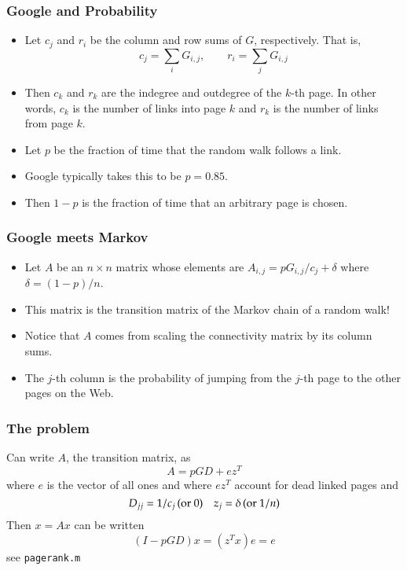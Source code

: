 \documentclass[10pt]{beamer}
\begin{document}
\begin{frame}
\frametitle{Google and Probability}
\begin{itemize}
\item Let $c_j$ and $r_i$ be the column and row sums of $G$,
respectively. That is,
$$c_j = \sum_i G_{i,j}, \qquad r_i = \sum_j G_{i,j}$$
\item Then $c_k$ and $r_k$ are the indegree and outdegree of the
$k$-th page.  In other words, $c_k$ is the number of links into page $k$ 
and $r_k$ is the number of links from page $k$.
\item Let $p$ be the fraction of time that the random walk follows
a link.
\item Google typically takes this to be $p = 0.85$.
\item Then $1-p$ is the fraction of time that an arbitrary page is
chosen.
\end{itemize}
\end{frame}
\begin{frame}
\frametitle{Google meets Markov}
\begin{itemize}
\item Let $A$ be an $n \times n$ matrix whose elements are
$A_{i,j}
= p G_{i,j}/c_j + \delta$ where $\delta = (1-p)/n$.
\item This matrix is the transition matrix of the Markov chain of
a random walk!
\item Notice that $A$ comes from scaling the connectivity matrix
by its column sums.
\item The $j$-th column is the probability of jumping from the
$j$-th page to the other pages on the Web.
\end{itemize}
\end{frame}
\begin{frame}
    \frametitle{The problem}
Can write $A$, the transition matrix, as
\[
A = p G D + e z^T
\]
where $e$ is the vector of all ones and where $ez^T$ account for dead linked 
pages and 
\[
D_{jj} = 1/c_j \,\textnormal{(or 0)}\quad z_j = \delta\, \textnormal{(or $1/n$)}
\]
Then $x=Ax$ can be written
\[
 (I-pGD)x = (z^Tx) e = e
\]
see \texttt{pagerank.m}
\end{frame}
\end{document}
